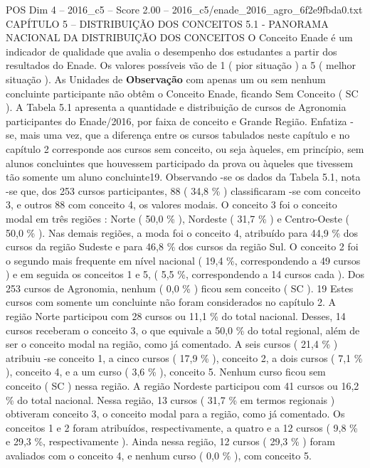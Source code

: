 \begin{textsample}{POS Dim 4 – 2016\_c5 – Score 2.00 – 2016\_c5/enade\_2016\_agro\_6f2e9fbda0.txt}  \label{ex:f4_pos_101}
CAPÍTULO 5 – DISTRIBUIÇÃO DOS CONCEITOS 5.1 - PANORAMA NACIONAL DA DISTRIBUIÇÃO DOS CONCEITOS O Conceito Enade é um indicador de qualidade que avalia o desempenho dos estudantes a partir dos resultados do Enade.
Os valores possíveis vão de 1 ( pior situação ) a 5 ( melhor situação ).
As Unidades de \textbf{Observação} com apenas um ou sem nenhum concluinte participante não obtêm o Conceito Enade, ficando Sem Conceito ( SC ).
A Tabela 5.1 apresenta a quantidade e distribuição de cursos de Agronomia participantes do Enade/2016, por faixa de conceito e Grande Região.
Enfatiza -se, mais uma vez, que a diferença entre os cursos tabulados neste capítulo e no capítulo 2 corresponde aos cursos sem conceito, ou seja àqueles, em princípio, sem alunos concluintes que houvessem participado da prova ou àqueles que tivessem tão somente um aluno concluinte19.
Observando -se os dados da Tabela 5.1, nota -se que, dos 253 cursos participantes, 88 ( 34,8 \% ) classificaram -se com conceito 3, e outros 88 com conceito 4, os valores modais.
O conceito 3 foi o conceito modal em três regiões : Norte ( 50,0 \% ), Nordeste ( 31,7 \% ) e Centro-Oeste ( 50,0 \% ).
Nas demais regiões, a moda foi o conceito 4, atribuído para 44,9 \% dos cursos da região Sudeste e para 46,8 \% dos cursos da região Sul.
O conceito 2 foi o segundo mais frequente em nível nacional ( 19,4 \%, correspondendo a 49 cursos ) e em seguida os conceitos 1 e 5, ( 5,5 \%, correspondendo a 14 cursos cada ).
Dos 253 cursos de Agronomia, nenhum ( 0,0 \% ) ficou sem conceito ( SC ). 19 Estes cursos com somente um concluinte não foram considerados no capítulo 2.
A região Norte participou com 28 cursos ou 11,1 \% do total nacional.
Desses, 14 cursos receberam o conceito 3, o que equivale a 50,0 \% do total regional, além de ser o conceito modal na região, como já comentado.
A seis cursos ( 21,4 \% ) atribuiu -se conceito 1, a cinco cursos ( 17,9 \% ), conceito 2, a dois cursos ( 7,1 \% ), conceito 4, e a um curso ( 3,6 \% ), conceito 5.
Nenhum curso ficou sem conceito ( SC ) nessa região.
A região Nordeste participou com 41 cursos ou 16,2 \% do total nacional.
Nessa região, 13 cursos ( 31,7 \% em termos regionais ) obtiveram conceito 3, o conceito modal para a região, como já comentado.
Os conceitos 1 e 2 foram atribuídos, respectivamente, a quatro e a 12 cursos ( 9,8 \% e 29,3 \%, respectivamente ).
Ainda nessa região, 12 cursos ( 29,3 \% ) foram avaliados com o conceito 4, e nenhum curso ( 0,0 \% ), com conceito 5.

\end{textsample}
